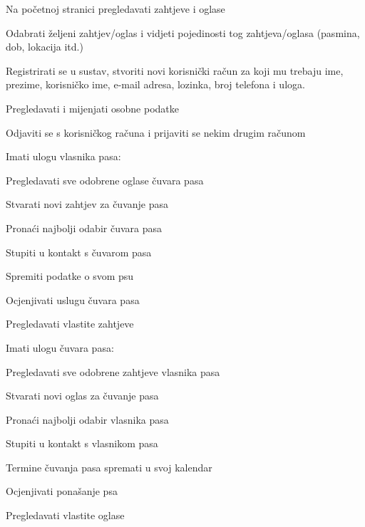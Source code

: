 			
			\begin{packed_enum}
				\item  {}
				
				\begin{packed_enum}
					
					\item Na početnoj stranici pregledavati zahtjeve i oglase
					\item Odabrati željeni zahtjev/oglas i vidjeti pojedinosti tog zahtjeva/oglasa (pasmina, dob, lokacija itd.)
					\item Registrirati se u sustav, stvoriti novi korisnički račun za koji mu trebaju ime, prezime, korisničko ime, e-mail adresa, lozinka, broj telefona i uloga.
				\end{packed_enum}
				
				\item  {}
				
				\begin{packed_enum}
					
					\item Pregledavati i mijenjati osobne podatke
					\item Odjaviti se s korisničkog računa i prijaviti se nekim drugim računom
					\item Imati ulogu vlasnika pasa:
					\begin{packed_enum}
						\item Pregledavati sve odobrene oglase čuvara pasa
						\item Stvarati novi zahtjev za čuvanje pasa
						\item Pronaći najbolji odabir čuvara pasa
						\item Stupiti u kontakt s čuvarom pasa
						\item Spremiti podatke o svom psu
						\item Ocjenjivati uslugu čuvara pasa
						\item Pregledavati vlastite zahtjeve
					\end{packed_enum}
					\item Imati ulogu čuvara pasa:
					\begin{packed_enum}
						\item Pregledavati sve odobrene zahtjeve vlasnika pasa
						\item Stvarati novi oglas za čuvanje pasa
						\item Pronaći najbolji odabir vlasnika pasa
						\item Stupiti u kontakt s vlasnikom pasa
						\item Termine čuvanja pasa spremati u svoj kalendar
						\item Ocjenjivati ponašanje psa
						\item Pregledavati vlastite oglase
					\end{packed_enum}
				\end{packed_enum}
			

\end{packed_enum}
